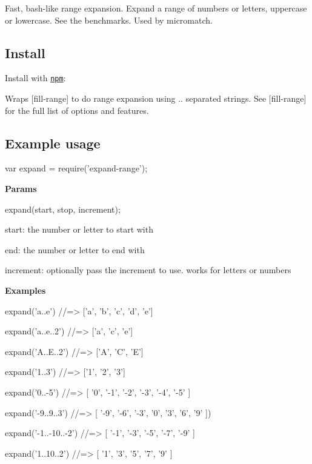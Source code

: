 Fast, bash-\/like range expansion. Expand a range of numbers or letters, uppercase or lowercase. See the benchmarks. Used by micromatch.

\subsection*{Install}

Install with \href{https://www.npmjs.com/}{\tt npm}\+:




Wraps \mbox{[}fill-\/range\mbox{]} to do range expansion using {\ttfamily ..} separated strings. See \mbox{[}fill-\/range\mbox{]} for the full list of options and features.

\subsection*{Example usage}


\begin{DoxyCode}
var expand = require('expand-range');
\end{DoxyCode}


{\bfseries Params}


\begin{DoxyCode}
expand(start, stop, increment);
\end{DoxyCode}



\begin{DoxyItemize}
\item {\ttfamily start}\+: the number or letter to start with
\item {\ttfamily end}\+: the number or letter to end with
\item {\ttfamily increment}\+: optionally pass the increment to use. works for letters or numbers
\end{DoxyItemize}

{\bfseries Examples}


\begin{DoxyCode}
expand('a..e')
//=> ['a', 'b', 'c', 'd', 'e']

expand('a..e..2')
//=> ['a', 'c', 'e']

expand('A..E..2')
//=> ['A', 'C', 'E']

expand('1..3')
//=> ['1', '2', '3']

expand('0..-5')
//=> [ '0', '-1', '-2', '-3', '-4', '-5' ]

expand('-9..9..3')
//=> [ '-9', '-6', '-3', '0', '3', '6', '9' ])

expand('-1..-10..-2')
//=> [ '-1', '-3', '-5', '-7', '-9' ]

expand('1..10..2')
//=> [ '1', '3', '5', '7', '9' ]
\end{DoxyCode}


